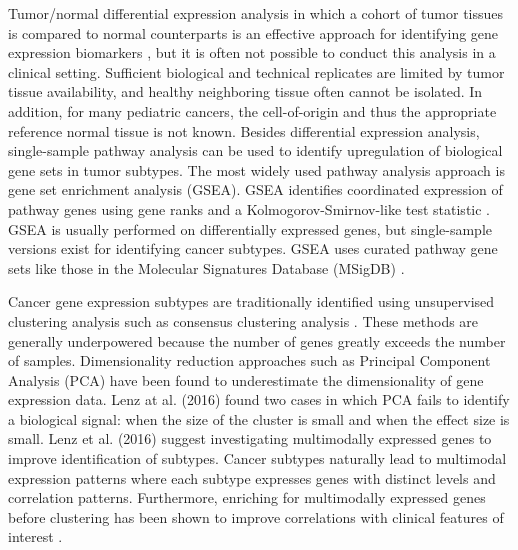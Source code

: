 \documentclass[10pt,letterpaper]{article}
\begin{document}
Tumor/normal differential expression analysis in which a cohort of tumor tissues is compared to normal counterparts is an effective approach for identifying gene expression biomarkers \cite{andersCountbasedDifferentialExpression2013, andersDifferentialExpressionAnalysis2010, sonesonComparisonMethodsDifferential2013}, but it is often not possible to conduct this analysis in a clinical setting. Sufficient biological and technical replicates are limited by tumor tissue availability, and healthy neighboring tissue often cannot be isolated. In addition, for many pediatric cancers, the cell-of-origin and thus the appropriate reference normal tissue is not known. Besides differential expression analysis, single-sample pathway analysis can be used to identify upregulation of biological gene sets in tumor subtypes. The most widely used pathway analysis approach is gene set enrichment analysis (GSEA). GSEA identifies coordinated expression of pathway genes using gene ranks and a Kolmogorov-Smirnov-like test statistic \cite{subramanianGeneSetEnrichment2005, moothaPGC1alpharesponsiveGenesInvolved2003}. GSEA is usually performed on differentially expressed genes, but single-sample versions exist for identifying cancer subtypes. GSEA uses curated pathway gene sets like those in the Molecular Signatures Database (MSigDB) \cite{liberzonMolecularSignaturesDatabase2011}.
 
Cancer gene expression subtypes are traditionally identified using unsupervised clustering analysis such as consensus clustering analysis \cite{oyeladeClusteringAlgorithmsTheir2016,johnM3CMonteCarlo2018,wilkersonConsensusClusterPlusClassDiscovery2010}. These methods are generally underpowered because the number of genes greatly exceeds the number of samples. Dimensionality reduction approaches such as Principal Component Analysis (PCA) have been found to underestimate the dimensionality of gene expression data. Lenz at al. (2016) found two cases in which PCA fails to identify a biological signal: when the size of the cluster is small and when the effect size is small. Lenz et al. (2016) suggest investigating multimodally expressed genes to improve identification of subtypes. Cancer subtypes naturally lead to multimodal expression patterns where each subtype expresses genes with distinct levels and correlation patterns. Furthermore, enriching for multimodally expressed genes before clustering has been shown to improve correlations with clinical features of interest \cite{yiliMultimodalityCriterionFeature2005}.
\end{document}
